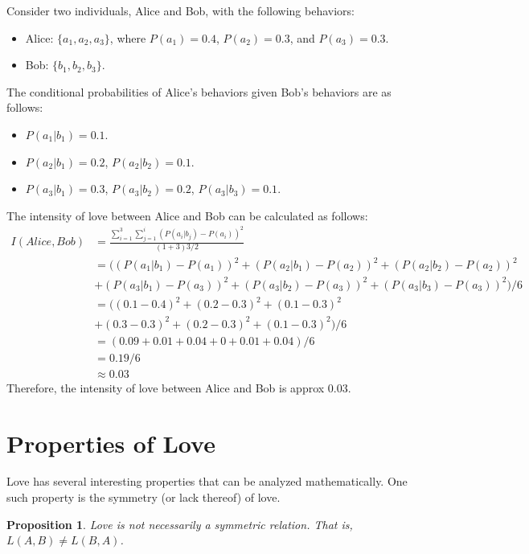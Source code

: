 \documentclass{article}
\newtheorem{proposition}{Proposition}
\begin{document}
Consider two individuals, Alice and Bob, with the following behaviors:
\begin{itemize}
    \item Alice: $\{a_1, a_2, a_3\}$, where $P(a_1) = 0.4$, $P(a_2) = 0.3$, and $P(a_3) = 0.3$.
    \item Bob: $\{b_1, b_2, b_3\}$.
\end{itemize}
The conditional probabilities of Alice's behaviors given Bob's behaviors are as follows:
\begin{itemize}
    \item $P(a_1 | b_1) = 0.1$.
    \item $P(a_2 | b_1) = 0.2$, $P(a_2 | b_2) = 0.1$.
    \item $P(a_3 | b_1) = 0.3$, $P(a_3 | b_2) = 0.2$, $P(a_3 | b_3) = 0.1$.
\end{itemize}
The intensity of love between Alice and Bob can be calculated as follows:
\begin{equation*}
    \begin{split}
        I(Alice, Bob) &= \frac{\sum_{i=1}^{3} \sum_{j=1}^{i} (P(a_i | b_j) - P(a_i))^2}{(1+3)3/2} \\
        &= ((P(a_1 | b_1) - P(a_1))^2 + (P(a_2 | b_1) - P(a_2))^2 + (P(a_2 | b_2) - P(a_2))^2 \\
        &+ (P(a_3 | b_1) - P(a_3))^2 + (P(a_3 | b_2) - P(a_3))^2 + (P(a_3 | b_3) - P(a_3))^2)/6 \\
        &= ((0.1 - 0.4)^2 + (0.2 - 0.3)^2 + (0.1 - 0.3)^2 \\
        &+ (0.3 - 0.3)^2 + (0.2 - 0.3)^2 + (0.1 - 0.3)^2)/6 \\
        &= (0.09 + 0.01 + 0.04 + 0 + 0.01 + 0.04)/6 \\
        &= 0.19/6 \\
        &\approx 0.03
    \end{split}
\end{equation*}
Therefore, the intensity of love between Alice and Bob is approx 0.03.

\section{Properties of Love}
Love has several interesting properties that can be analyzed mathematically. One such property is the symmetry (or lack thereof) of love.

\begin{proposition}
    Love is not necessarily a symmetric relation. That is, $L(A, B) \neq L(B, A)$.
\end{proposition}
\end{document}
